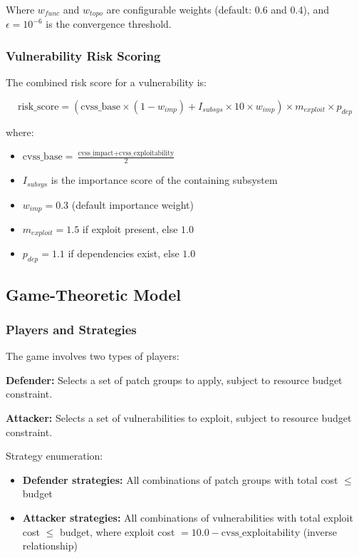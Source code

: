 \documentclass[conference]{IEEEtran}
\begin{document}
Where $w_{func}$ and $w_{topo}$ are configurable weights (default: 0.6 and 0.4), and $\epsilon = 10^{-6}$ is the convergence threshold.

\subsubsection{Vulnerability Risk Scoring}
The combined risk score for a vulnerability is:

\begin{equation}
\text{risk\_score} = \left( \text{cvss\_base} \times (1 - w_{imp}) + I_{subsys} \times 10 \times w_{imp} \right) \times m_{exploit} \times p_{dep}
\end{equation}

where:
\begin{itemize}
    \item $\text{cvss\_base} = \frac{\text{cvss\_impact} + \text{cvss\_exploitability}}{2}$
    \item $I_{subsys}$ is the importance score of the containing subsystem
    \item $w_{imp} = 0.3$ (default importance weight)
    \item $m_{exploit} = 1.5$ if exploit present, else $1.0$
    \item $p_{dep} = 1.1$ if dependencies exist, else $1.0$
\end{itemize}

\subsection{Game-Theoretic Model}

\subsubsection{Players and Strategies}
The game involves two types of players:

\textbf{Defender:} Selects a set of patch groups to apply, subject to resource budget constraint.

\textbf{Attacker:} Selects a set of vulnerabilities to exploit, subject to resource budget constraint.

Strategy enumeration:
\begin{itemize}
    \item \textbf{Defender strategies:} All combinations of patch groups with total cost $\leq$ budget
    \item \textbf{Attacker strategies:} All combinations of vulnerabilities with total exploit cost $\leq$ budget, where exploit cost $= 10.0 - \text{cvss\_exploitability}$ (inverse relationship)
\end{itemize}
\end{document}
